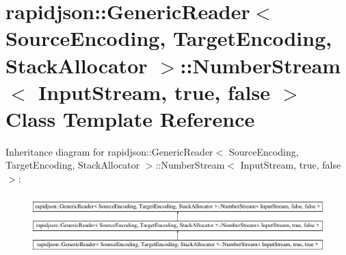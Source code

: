 \hypertarget{classrapidjson_1_1_generic_reader_1_1_number_stream_3_01_input_stream_00_01true_00_01false_01_4}{}\section{rapidjson\+::Generic\+Reader$<$ Source\+Encoding, Target\+Encoding, Stack\+Allocator $>$\+::Number\+Stream$<$ Input\+Stream, true, false $>$ Class Template Reference}
\label{classrapidjson_1_1_generic_reader_1_1_number_stream_3_01_input_stream_00_01true_00_01false_01_4}
Inheritance diagram for rapidjson\+::Generic\+Reader$<$ Source\+Encoding, Target\+Encoding, Stack\+Allocator $>$\+::Number\+Stream$<$ Input\+Stream, true, false $>$\+:\begin{figure}[H]
\begin{center}
\leavevmode
\includegraphics[height=2.326870cm]{classrapidjson_1_1_generic_reader_1_1_number_stream_3_01_input_stream_00_01true_00_01false_01_4}
\end{center}
\end{figure}
